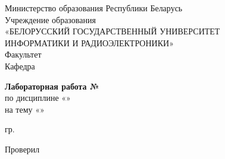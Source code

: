 \begin{titlepage}
  \begin{center}
    Министерство образования Республики Беларусь\\[1em]
    Учреждение образования\\
    «БЕЛОРУССКИЙ ГОСУДАРСТВЕННЫЙ УНИВЕРСИТЕТ\\
    ИНФОРМАТИКИ И РАДИОЭЛЕКТРОНИКИ»\\[1em]

    Факультет \labFaculty\\
    Кафедра \labDepartment

    \vspace{5em}

    \textbf{\large Лабораторная работа №\labNumber}\\[1em]
    по дисциплине «\labDiscipline»\\[1em]
    на тему «\labTopic»

    \vspace{6em}

    \begin{minipage}[t]{0.45\textwidth}
      \labStudentVerb{} гр. \labStudentGroup
    \end{minipage}
    \hspace{3em}
    \begin{minipage}[t]{0.35\textwidth}
      \labStudentName
    \end{minipage}

    \vspace{2em}

    \begin{minipage}[t]{0.45\textwidth}
      Проверил
    \end{minipage}
    \hspace{3em}
    \begin{minipage}[t]{0.35\textwidth}
      \labTeacherName
    \end{minipage}

    \vfill
    {\normalsize \labCity{} \labYear}
  \end{center}
\end{titlepage}
